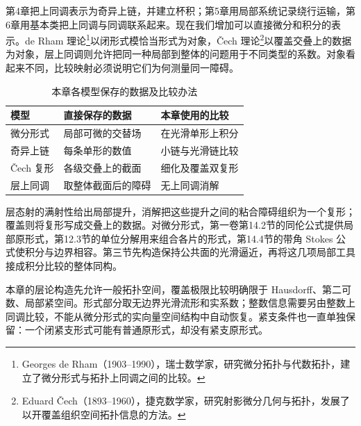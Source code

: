 \ProseParagraphBreak

第4章把上同调表示为奇异上链，并建立杯积；第5章用局部系统记录绕行运输，第6章用基本类把上同调与同调联系起来。现在我们增加可以直接微分和积分的表示。de Rham 理论\footnote{Georges de Rham（1903--1990），瑞士数学家，研究微分拓扑与代数拓扑，建立了微分形式与拓扑上同调之间的比较。}以闭形式模恰当形式为对象，Čech 理论\footnote{Eduard Čech（1893--1960），捷克数学家，研究射影微分几何与拓扑，发展了以开覆盖组织空间拓扑信息的方法。}以覆盖交叠上的数据为对象，层上同调则允许把同一种局部到整体的问题用于不同类型的系数。对象看起来不同，比较映射必须说明它们为何测量同一障碍。

\begin{table}[htbp]
	\centering
	\caption{本章各模型保存的数据及比较办法}
	\label{g2:tab:cohomology-models}
	\begin{tabular}{lll}
		\toprule
		模型 & 直接保存的数据 & 本章使用的比较 \\
		\midrule
		微分形式 & 局部可微的交替场 & 在光滑单形上积分 \\
		奇异上链 & 每条单形的数值 & 小链与光滑链比较 \\
		Čech 复形 & 各级交叠上的截面 & 细化及覆盖双复形 \\
		层上同调 & 取整体截面后的障碍 & 无上同调消解 \\
		\bottomrule
	\end{tabular}
\end{table}

层态射的满射性给出局部提升，消解把这些提升之间的粘合障碍组织为一个复形；覆盖则将复形写成交叠上的数据。对微分形式，第一卷第14.2节的同伦公式提供局部原形式，第12.3节的单位分解用来组合各片的形式，第14.4节的带角 Stokes 公式使积分与边界相容。第三节先构造保持公共面的光滑逼近，再将这几项局部工具接成积分比较的整体同构。

\ProseParagraphBreak

本章的层论构造先允许一般拓扑空间，覆盖极限比较明确限于 Hausdorff、第二可数、局部紧空间。形式部分取无边界光滑流形和实系数；整数信息需要另由整数上同调比较，不能从微分形式的实向量空间结构中自动恢复。紧支条件也一直单独保留：一个闭紧支形式可能有普通原形式，却没有紧支原形式。






